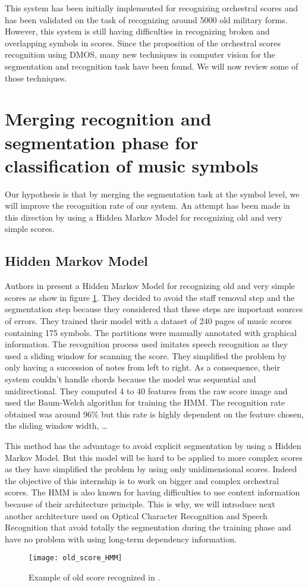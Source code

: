 \documentclass[11pt]{sdm}
\begin{document}
This system has been initially implemented for recognizing orchestral scores and has been validated on the task of recognizing around 5000 old military forms.
However, this system is still having difficulties in recognizing broken and overlapping symbols in scores.
Since the proposition of the orchestral scores recognition using DMOS, many new techniques in computer vision for the segmentation and recognition task have been found.
We will now review some of those techniques.

\section{Merging recognition and segmentation phase for classification of music symbols}

Our hypothesis is that by merging the segmentation task at the symbol level, we will improve the recognition rate of our system.
An attempt has been made in this direction by using a Hidden Markov Model for recognizing old and very simple scores.

\subsection{Hidden Markov Model}

Authors in \cite{pugin_optical_2006} present a Hidden Markov Model for recognizing old and very simple scores as show in figure \ref{old_score_HMM}.
They decided to avoid the staff removal step and the segmentation step because they considered that these steps are important sources of errors.
They trained their model with a dataset of 240 pages of music scores containing 175 symbols.
The partitions were manually annotated with graphical information.
The recognition process used imitates speech recognition as they used a sliding window for scanning the score.
They simplified the problem by only having a succession of notes from left to right.
As a consequence, their system couldn't handle chords because the model was sequential and unidirectional.
They computed 4 to 40 features from the raw score image and used the Baum-Welch algorithm for training the HMM.
The recognition rate obtained was around 96\% but this rate is highly dependent on the feature chosen, the sliding window width, \ldots

This method has the advantage to avoid explicit segmentation by using a Hidden Markov Model.
But this model will be hard to be applied to more complex scores as they have simplified the problem by using only unidimensional scores.
Indeed the objective of this internship is to work on bigger and complex orchestral scores.
The HMM is also known for having difficulties to use context information because of their architecture principle.
This is why, we will introduce next another architecture used on Optical Character Recognition and Speech Recognition that avoid totally the segmentation during the training phase and have no problem with using long-term dependency information.
\begin{figure}[btp]
  \texttt{[image: old\_score\_HMM]}
  \caption{\label{old_score_HMM} Example of old score recognized in \cite{pugin_optical_2006}. }
\end{figure}
\end{document}
